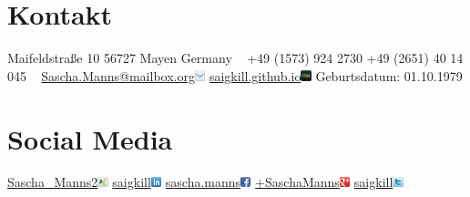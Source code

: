 \documentclass[a4paper]{friggeri-cv} %
\begin{document}


\begin{aside} %
\section{Kontakt}
Maifeldstraße 10
56727 Mayen
Germany
~
+49 (1573) 924 2730
+49 (2651) 40 14 045
~
\href{mailto:Sascha.Manns@mailbox.org}{Sascha.Manns@mailbox.org}\includegraphics[width=0.3cm]{../Pictures/email.png}
\href{http://saigkill.github.io}{saigkill.github.io}\includegraphics[width=0.3cm]{../Pictures/aboutme.png}
Geburtsdatum: 01.10.1979
\section{Social Media}
\href{https://www.xing.com/profile/Sascha\_Manns2}{Sascha\_Manns2}\includegraphics[width=0.3cm]{../Pictures/xing.png}
\href{https://www.linkedin.com/in/saigkill}{saigkill}\includegraphics[width=0.3cm]{../Pictures/linkedin.png}
\href{https://www.facebook.com/sascha.manns}{sascha.manns}\includegraphics[width=0.3cm]{../Pictures/facebook.png}
\href{https://plus.google.com/+SaschaManns}{+SaschaManns}\includegraphics[width=0.3cm]{../Pictures/google-plus.png}
\href{https://twitter.com/saigkill}{saigkill}\includegraphics[width=0.3cm]{../Pictures/twitter.png}

\end{aside}
\end{document}
